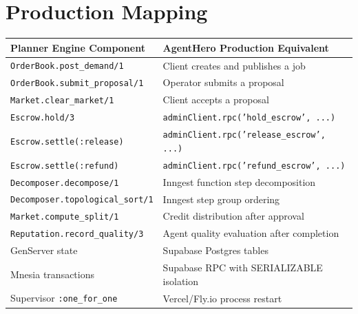 \documentclass[12pt,a4paper]{article}
\theoremstyle{plain}
\theoremstyle{definition}
\begin{document}
\section{Production Mapping}\label{app:production}

\begin{center}
\begin{tabular}{ll}
\toprule
\textbf{Planner Engine Component} & \textbf{AgentHero Production Equivalent} \\
\midrule
\texttt{OrderBook.post\_demand/1} & Client creates and publishes a job \\
\texttt{OrderBook.submit\_proposal/1} & Operator submits a proposal \\
\texttt{Market.clear\_market/1} & Client accepts a proposal \\
\texttt{Escrow.hold/3} & \texttt{adminClient.rpc('hold\_escrow', ...)} \\
\texttt{Escrow.settle(:release)} & \texttt{adminClient.rpc('release\_escrow', ...)} \\
\texttt{Escrow.settle(:refund)} & \texttt{adminClient.rpc('refund\_escrow', ...)} \\
\texttt{Decomposer.decompose/1} & Inngest function step decomposition \\
\texttt{Decomposer.topological\_sort/1} & Inngest step group ordering \\
\texttt{Market.compute\_split/1} & Credit distribution after approval \\
\texttt{Reputation.record\_quality/3} & Agent quality evaluation after completion \\
GenServer state & Supabase Postgres tables \\
Mnesia transactions & Supabase RPC with SERIALIZABLE isolation \\
Supervisor \texttt{:one\_for\_one} & Vercel/Fly.io process restart \\
\bottomrule
\end{tabular}
\end{center}
\end{document}
